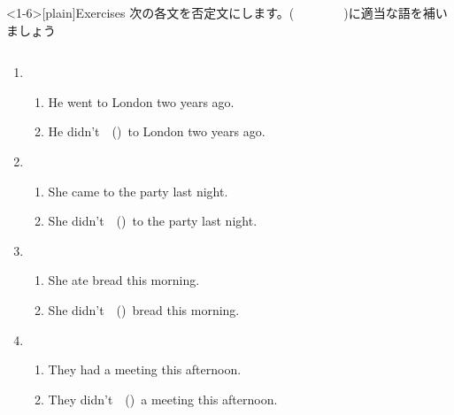 \documentclass[aspectratio=169,xcolor={dvipsnames,table}]{beamer}
\newcommand{\myaudio}[1]{\href{#1}{\faVolumeUp}}
\begin{document}
\begin{frame}<1-6>[plain]{Exercises}
 次の各文を否定文にします。(~~~~~~~~)に適当な語を補いましょう

\begin{columns}
\begin{column}{.6\textwidth}
\begin{enumerate}
 \item \begin{enumerate}
	\item He went to London two years ago.
	\item He didn't~~()\,\,\,to London two years ago.
       \end{enumerate}
 \item \begin{enumerate}
	\item She came to the party last night.
	\item She didn't~~()\,\,\,to the party last night.
       \end{enumerate}
 \item \begin{enumerate}
	\item She ate bread this morning.
	\item She didn't~~()\,\,\,bread this morning.
       \end{enumerate}
 \item \begin{enumerate}
	\item They had a meeting this afternoon.
	\item They didn't~~()\,\,\,a meeting this afternoon.
       \end{enumerate}
\end{enumerate}
\end{column}
\begin{column}{.35\textwidth}
%
\end{column}
\end{columns}
\hfill\myaudio{./audio/026_past_didnot_06.mp3}

\end{frame}
\end{document}
